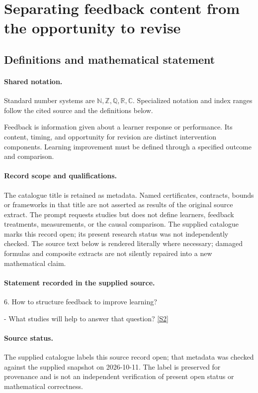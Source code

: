 \documentclass[11pt]{article}
\newcommand{\sref}[2]{\hyperlink{source:#1:#2}{[S#2]}}
\begin{document}
\section{Separating feedback content from the opportunity to revise}\label{statement}

\subsection{Definitions and mathematical statement}

\paragraph{Shared notation.}Standard number systems are $\mathbb N,\mathbb Z,\mathbb Q,\mathbb R,\mathbb C$. Specialized notation and index ranges follow the cited source and the definitions below.


Feedback is information given about a learner response or performance. Its content, timing, and opportunity for revision are distinct intervention components. Learning improvement must be defined through a specified outcome and comparison.
\paragraph{Record scope and qualifications.}
The catalogue title is retained as metadata. Named certificates, contracts, bounds or frameworks in that title are not asserted as results of the original source extract.
The prompt requests studies but does not define learners, feedback treatments, measurements, or the causal comparison. The supplied catalogue marks this record open; its present research status was not independently checked.
The source text below is rendered literally where necessary; damaged formulas and composite extracts are not silently repaired into a new mathematical claim.
\paragraph{Statement recorded in the supplied source.}
6. How to structure feedback to improve learning?

- What studies will help to answer that question? \sref{statement}{2}
\paragraph{Source status.}
The supplied catalogue labels this source record open; that metadata was checked against the supplied snapshot on 2026-10-11. The label is preserved for provenance and is not an independent verification of present open status or mathematical correctness.
\end{document}
